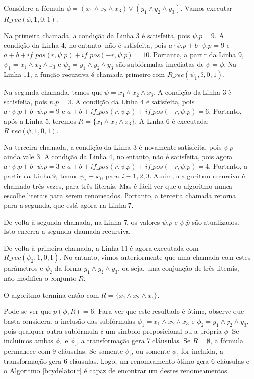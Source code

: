\begin{example}
	Considere a fórmula $\phi = (x_1 \wedge x_2 \wedge x_3) \vee (y_1 \wedge y_2 \wedge y_3)$. Vamos executar $R\_rec(\phi,1,0,1)$.
	
	Na primeira chamada, a condição da Linha 3 é satisfeita, pois $\psi.p = 9$. A condição da Linha 4, no entanto, não é satisfeita, pois $a \cdot \psi.p + b \cdot \psi.\overline{p} = 9$ e $a + b + if\_pos(r,\psi.p) + if\_pos(-r,\psi.\overline{p}) = 10$. Portanto, a partir da Linha 9, $\psi_1 = x_1 \wedge x_2 \wedge x_3$ e $\psi_2 = y_1 \wedge y_2 \wedge y_3$ são subfórmulas imediatas de $\psi = \phi$. Na Linha 11, a função recursiva é chamada primeiro com $R\_rec(\psi_1,3,0,1)$.
	
	Na segunda chamada, temos que $\psi = x_1 \wedge x_2 \wedge x_3$. A condição da Linha 3 é satisfeita, pois $\psi.p = 3$. A condição da Linha 4 é satisfeita, pois $a \cdot \psi.p + b \cdot \psi.\overline{p} = 9$ e $a + b + if\_pos(r,\psi.p) + if\_pos(-r,\psi.\overline{p}) = 6$. Portanto, após a Linha 5, teremos $R = \{x_1 \wedge x_2 \wedge x_3 \}$. A Linha 6 é executada: $R\_rec(\psi,1,0,1)$.
	
	Na terceira chamada, a condição da Linha 3 é novamente satisfeita, pois $\psi.p$ ainda vale 3. A condição da Linha 4, no entanto, não é satisfeita, pois agora $a \cdot \psi.p + b \cdot \psi.\overline{p} = 3$ e $a + b + if\_pos(r,\psi.p) + if\_pos(-r,\psi.\overline{p}) = 4$. Portanto, a partir da Linha 9, temos $\psi_i = x_i$, para $i=1,2,3$. Assim, o algoritmo recursivo é chamado três vezes, para três literais. Mas é fácil ver que o algoritmo nunca escolhe literais para serem renomeados. Portanto, a terceira chamada retorna para a segunda, que está agora na Linha 7.
	
	De volta à segunda chamada, na Linha 7, os valores $\psi.p$ e $\psi.\overline{p}$ são atualizados. Isto encerra a segunda chamada recursiva.
	
	De volta à primeira chamada, a Linha 11 é agora executada com $R\_rec(\psi_2,1,0,1)$. No entanto, vimos anteriormente que uma chamada com estes parâmetros e $\psi_2$ da forma $y_1 \wedge y_2 \wedge y_3$, ou seja, uma conjunção de três literais, não modifica o conjunto $R$.
	
	O algoritmo termina então com $R = \{x_1 \wedge x_2 \wedge x_3 \}$.
	
	Pode-se ver que $p(\phi,R) = 6$. Para ver que este resultado é ótimo, observe que basta considerar a inclusão das subfórmulas $\phi_1 = x_1 \wedge x_2 \wedge x_3$ e $\phi_2 = y_1 \wedge y_2 \wedge y_3$, pois qualquer outra subfórmula é um símbolo proposicional ou a própria $\phi$. Se incluímos ambas $\phi_1$ e $\phi_2$, a transformação gera 7 cláusulas. Se $R = \emptyset$, a fórmula permanece com 9 cláusulas. Se somente $\phi_1$, ou somente $\phi_2$ for incluída, a transformação gera 6 cláusulas. Logo, um renomeamento ótimo gera 6 cláusulas e o Algoritmo \ref{boydelatour} é capaz de encontrar um destes renomeamentos.
\end{example}

